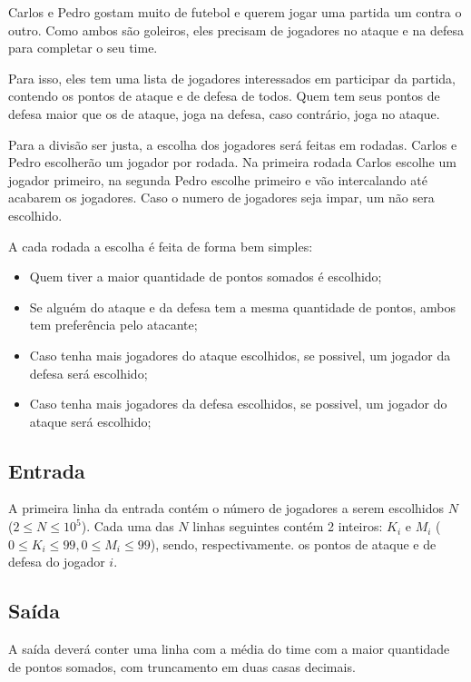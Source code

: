     Carlos e Pedro gostam muito de futebol e querem jogar uma partida um contra o outro. Como ambos são goleiros, eles precisam de jogadores no ataque e na defesa para completar o seu time.

    Para isso, eles tem uma lista de jogadores interessados em participar da partida, contendo os
pontos de ataque e de defesa de todos. Quem tem seus pontos de defesa maior que os de ataque, joga na defesa,
caso contrário, joga no ataque.

    Para a divisão ser justa, a escolha dos jogadores será feitas em rodadas. Carlos e Pedro escolherão um jogador por rodada.
Na primeira rodada Carlos escolhe um jogador primeiro, na segunda Pedro escolhe primeiro e vão intercalando até acabarem os jogadores. Caso o numero de jogadores
seja impar, um não sera escolhido.

    A cada rodada a escolha é feita de forma bem simples:
\begin{itemize}
    \item Quem tiver a maior quantidade de pontos somados é escolhido;
    \item Se alguém do ataque e da defesa tem a mesma quantidade de pontos, ambos tem preferência pelo atacante;
    \item Caso tenha mais jogadores do ataque escolhidos, se possivel, um jogador da defesa será escolhido;
    \item Caso tenha mais jogadores da defesa escolhidos, se possivel, um jogador do ataque será escolhido;
\end{itemize}

\subsection*{Entrada}

A primeira linha da entrada contém o número de jogadores a serem escolhidos $N$ ($2\leq N\leq 10^5$).
Cada uma das $N$ linhas seguintes contém 2 inteiros: $K_i$ e $M_i$ ($0\leq K_i\leq 99, 0\leq M_i\leq 99$), sendo, respectivamente. os pontos de ataque
e de defesa do jogador $i$.  

\subsection*{Saída}

A saída deverá conter uma linha com a média do time com a maior quantidade de pontos somados, com truncamento em duas casas decimais.

